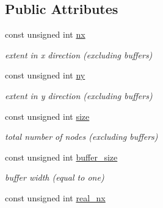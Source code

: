 \subsection*{\-Public \-Attributes}
\begin{DoxyCompactItemize}
\item 
\hypertarget{classlb_1_1lattice_af99fea0978f135489d3f79a09b9e80f4}{const unsigned int \hyperlink{classlb_1_1lattice_af99fea0978f135489d3f79a09b9e80f4}{nx}}\label{classlb_1_1lattice_af99fea0978f135489d3f79a09b9e80f4}

\begin{DoxyCompactList}\small\item\em extent in x direction (excluding buffers) \end{DoxyCompactList}\item 
\hypertarget{classlb_1_1lattice_aef391575796aae0d0e01adc1062ebe0b}{const unsigned int \hyperlink{classlb_1_1lattice_aef391575796aae0d0e01adc1062ebe0b}{ny}}\label{classlb_1_1lattice_aef391575796aae0d0e01adc1062ebe0b}

\begin{DoxyCompactList}\small\item\em extent in y direction (excluding buffers) \end{DoxyCompactList}\item 
\hypertarget{classlb_1_1lattice_a137ba8e4a67de2e08e9e1f8d52c8a1d0}{const unsigned int \hyperlink{classlb_1_1lattice_a137ba8e4a67de2e08e9e1f8d52c8a1d0}{size}}\label{classlb_1_1lattice_a137ba8e4a67de2e08e9e1f8d52c8a1d0}

\begin{DoxyCompactList}\small\item\em total number of nodes (excluding buffers) \end{DoxyCompactList}\item 
\hypertarget{classlb_1_1lattice_a0c300ff43f838dc9d528ceb5019df418}{const unsigned int \hyperlink{classlb_1_1lattice_a0c300ff43f838dc9d528ceb5019df418}{buffer\-\_\-size}}\label{classlb_1_1lattice_a0c300ff43f838dc9d528ceb5019df418}

\begin{DoxyCompactList}\small\item\em buffer width (equal to one) \end{DoxyCompactList}\item 
\hypertarget{classlb_1_1lattice_a72671995cc057ad34dc32010fa77efe0}{const unsigned int \hyperlink{classlb_1_1lattice_a72671995cc057ad34dc32010fa77efe0}{real\-\_\-nx}}\label{classlb_1_1lattice_a72671995cc057ad34dc32010fa77efe0}


\end{DoxyCompactItemize}
